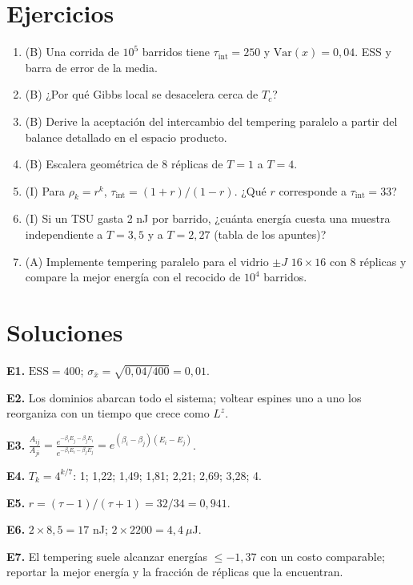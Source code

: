 \documentclass[11pt,a4paper]{article}
\begin{document}
\section{Ejercicios}
\begin{enumerate}[label=\textbf{E\arabic*.}]
\item (B) Una corrida de $10^5$ barridos tiene $\tau_{\text{int}}=250$ y $\mathrm{Var}(x)=0{,}04$. ESS y barra de error de la media.
\item (B) ¿Por qué Gibbs local se desacelera cerca de $T_c$?
\item (B) Derive la aceptación del intercambio del tempering paralelo a partir del balance detallado en el espacio producto.
\item (B) Escalera geométrica de 8 réplicas de $T=1$ a $T=4$.
\item (I) Para $\rho_k=r^k$, $\tau_{\text{int}}=(1+r)/(1-r)$. ¿Qué $r$ corresponde a $\tau_{\text{int}}=33$?
\item (I) Si un TSU gasta 2 nJ por barrido, ¿cuánta energía cuesta una muestra independiente a $T=3{,}5$ y a $T=2{,}27$ (tabla de los apuntes)?
\item (A) Implemente tempering paralelo para el vidrio $\pm J$ $16\times16$ con 8 réplicas y compare la mejor energía con el recocido de $10^4$ barridos.
\end{enumerate}
\section{Soluciones}
\begin{solucion}
\textbf{E1.} $\mathrm{ESS}=400$; $\sigma_{\bar x}=\sqrt{0{,}04/400}=0{,}01$.

\textbf{E2.} Los dominios abarcan todo el sistema; voltear espines uno a uno los reorganiza con un tiempo que crece como $L^z$.

\textbf{E3.} $\frac{A_{ij}}{A_{ji}}=\frac{e^{-\beta_iE_j-\beta_jE_i}}{e^{-\beta_iE_i-\beta_jE_j}}=e^{(\beta_i-\beta_j)(E_i-E_j)}$.

\textbf{E4.} $T_k=4^{k/7}$: 1; 1,22; 1,49; 1,81; 2,21; 2,69; 3,28; 4.

\textbf{E5.} $r=(\tau-1)/(\tau+1)=32/34=0{,}941$.

\textbf{E6.} $2\times8{,}5=17$ nJ; $2\times2200=4{,}4\ \mu$J.

\textbf{E7.} El tempering suele alcanzar energías $\le-1{,}37$ con un costo comparable; reportar la mejor energía y la fracción de réplicas que la encuentran.
\end{solucion}
\end{document}
